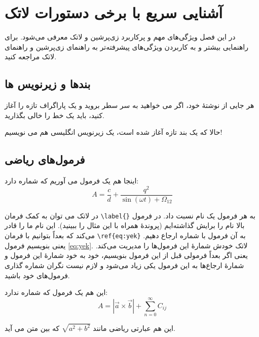 
\chapter{آشنایی سریع با برخی دستورات لاتک}\label{Chap:chapter2}

در این فصل ویژگی‌های مهم و پرکاربرد زی‌پرشین و لاتک معرفی می‌شود. برای راهنمایی بیشتر و به کاربردن ویژگی‌های پیشرفته‌تر به راهنمای زی‌پرشین 
و راهنمای لاتک مراجعه کنید. 

\section{بندها و زیرنویس ها}
هر جایی از نوشتهٔ خود، اگر می خواهید به سر سطر بروید و یک پاراگراف تازه را آغاز کنید، باید یک خط را خالی بگذارید.

حالا که یک بند تازه آغاز شده است، یک زیرنویس انگلیسی%
 هم می نویسیم!
\section{فرمول‌های ریاضی}\label{formula}

اینجا هم یک فرمول می آوریم که شماره دارد:
\begin{equation}\label{eq:yek}
A=\frac{c}{d}+\frac{q^2}{\sin(\omega t)+\Omega_{12}}
\end{equation}


در لاتک می توان به کمک فرمان 
\Verb+\label{}+
به هر فرمول یک نام نسبت داد. در فرمول بالا نام  را برایش گذاشته‌ایم (پروندهٔ  همراه با این مثال را ببینید). این نام ما را قادر می‌کند که بعداً بتوانیم با فرمان
\Verb+\ref{eq:yek}+
به آن فرمول با شماره ارجاع دهیم. یعنی بنویسیم فرمول \ref{eq:yek}. 
لاتک خودش شمارهٔ این فرمول‌ها را مدیریت می‌کند. یعنی اگر بعداً فرمولی قبل از این فرمول بنویسیم، خود به خود شمارهٔ این فرمول و شمارهٔ ارجاع‌ها 
به‌ این فرمول یکی زیاد می‌شود و لازم نیست نگران شماره گذاری فرمول‌های خود باشید.

این هم یک فرمول که شماره ندارد:
$$A=|\vec{a}\times \vec{b}| + \sum_{n=0}^\infty C_{ij}$$

این هم عبارتی ریاضی مانند 
$\sqrt{a^2+b^2}$
 که بین متن می آید.

